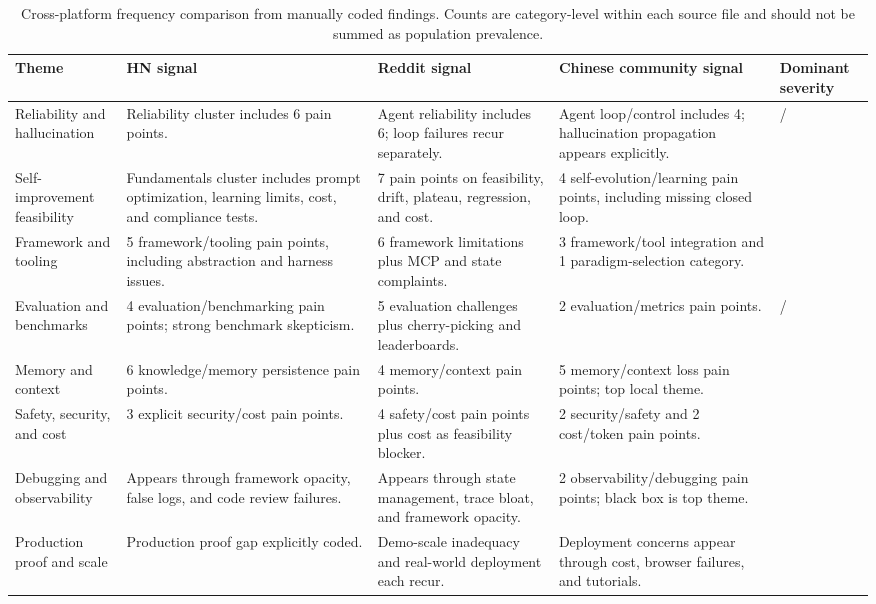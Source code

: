\begin{table}[t]
\centering
\scriptsize
\setlength{\tabcolsep}{2pt}
\renewcommand{\arraystretch}{1.08}
\caption{Cross-platform frequency comparison from manually coded findings. Counts are category-level within each source file and should not be summed as population prevalence.}
\label{tab:platform-frequency}
\begin{tabularx}{\textwidth}{@{}L{0.20\textwidth}L{0.18\textwidth}L{0.18\textwidth}L{0.18\textwidth}Y@{}}
\toprule
\textbf{Theme} & \textbf{HN signal} & \textbf{Reddit signal} & \textbf{Chinese community signal} & \textbf{Dominant severity} \\
\midrule
Reliability and hallucination & Reliability cluster includes 6 pain points. & Agent reliability includes 6; loop failures recur separately. & Agent loop/control includes 4; hallucination propagation appears explicitly. & \sevcritical{}/\sevhigh{} \\
Self-improvement feasibility & Fundamentals cluster includes prompt optimization, learning limits, cost, and compliance tests. & 7 pain points on feasibility, drift, plateau, regression, and cost. & 4 self-evolution/learning pain points, including missing closed loop. & \sevcritical{} \\
Framework and tooling & 5 framework/tooling pain points, including abstraction and harness issues. & 6 framework limitations plus MCP and state complaints. & 3 framework/tool integration and 1 paradigm-selection category. & \sevhigh{} \\
Evaluation and benchmarks & 4 evaluation/benchmarking pain points; strong benchmark skepticism. & 5 evaluation challenges plus cherry-picking and leaderboards. & 2 evaluation/metrics pain points. & \sevcritical{}/\sevhigh{} \\
Memory and context & 6 knowledge/memory persistence pain points. & 4 memory/context pain points. & 5 memory/context loss pain points; top local theme. & \sevhigh{} \\
Safety, security, and cost & 3 explicit security/cost pain points. & 4 safety/cost pain points plus cost as feasibility blocker. & 2 security/safety and 2 cost/token pain points. & \sevcritical{} \\
Debugging and observability & Appears through framework opacity, false logs, and code review failures. & Appears through state management, trace bloat, and framework opacity. & 2 observability/debugging pain points; black box is top theme. & \sevhigh{} \\
Production proof and scale & Production proof gap explicitly coded. & Demo-scale inadequacy and real-world deployment each recur. & Deployment concerns appear through cost, browser failures, and tutorials. & \sevhigh{} \\
\bottomrule
\end{tabularx}
\end{table}


